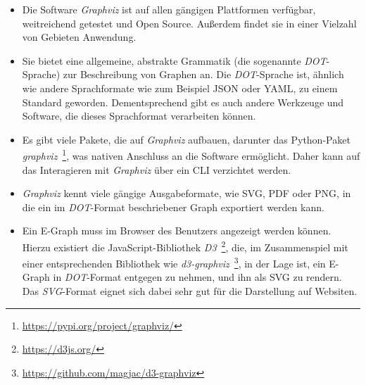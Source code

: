 \begin{itemize}
    \item Die Software \textit{Graphviz} ist auf allen gängigen Plattformen verfügbar, weitreichend getestet und Open Source. Außerdem findet sie in einer Vielzahl von Gebieten Anwendung.
    \item Sie bietet eine allgemeine, abstrakte Grammatik (die sogenannte \textit{DOT}-Sprache) zur Beschreibung von Graphen an. Die \textit{DOT}-Sprache ist, ähnlich wie andere Sprachformate wie
    zum Beispiel JSON oder YAML, zu einem Standard geworden. Dementsprechend gibt es auch andere Werkzeuge und Software, die dieses Sprachformat verarbeiten können.
    \item Es gibt viele Pakete, die auf \textit{Graphviz} aufbauen, darunter das Python-Paket \textit{graphviz}~\footnote{\hspace{1.5mm}\url{https://pypi.org/project/graphviz/}}, was nativen Anschluss an die Software ermöglicht. 
    Daher kann auf das Interagieren mit \textit{Graphviz} über ein CLI verzichtet werden.
    \item \textit{Graphviz} kennt viele gängige Ausgabeformate, wie SVG, PDF oder PNG, in die ein im \textit{DOT}-Format beschriebener Graph exportiert werden kann.
    \item Ein E-Graph muss im Browser des Benutzers angezeigt werden können. Hierzu existiert die JavaScript-Bibliothek \textit{D3}~\footnote{\hspace{1.5mm}\url{https://d3js.org/}}, die, im Zusammenspiel
    mit einer entsprechenden Bibliothek wie \textit{d3-graphviz}~\footnote{\hspace{1.5mm}\url{https://github.com/magjac/d3-graphviz}}, in der Lage ist, ein E-Graph in \textit{DOT}-Format entgegen zu nehmen,
    und ihn als SVG zu rendern. Das \textit{SVG}-Format eignet sich dabei sehr gut für die Darstellung auf Websiten.
\end{itemize}

